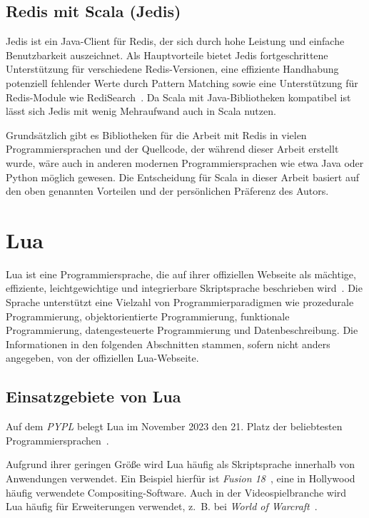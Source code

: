\subsection{Redis mit Scala (Jedis)} %
Jedis ist ein Java-Client für Redis, der sich durch hohe Leistung und einfache Benutzbarkeit auszeichnet. Als Hauptvorteile bietet Jedis fortgeschrittene Unterstützung für verschiedene Redis-Versionen, eine effiziente Handhabung potenziell fehlender Werte durch Pattern Matching sowie eine Unterstützung für Redis-Module wie RediSearch~\cite{redis_inc_jedis_2023}.
Da Scala mit Java-Bibliotheken kompatibel ist lässt sich Jedis mit wenig Mehraufwand auch in Scala nutzen. %

Grundsätzlich gibt es Bibliotheken für die Arbeit mit Redis in vielen Programmiersprachen und der Quellcode, der während dieser Arbeit erstellt wurde, wäre auch in anderen modernen Programmiersprachen wie etwa Java oder Python möglich gewesen.
Die Entscheidung für Scala in dieser Arbeit basiert auf den oben genannten Vorteilen und der persönlichen Präferenz des Autors.


\section{Lua}
Lua ist eine Programmiersprache, die auf ihrer offiziellen Webseite als mächtige, effiziente, leichtgewichtige und integrierbare Skriptsprache beschrieben wird~\cite{ierusalimschy_lua_nodate}. Die Sprache unterstützt eine Vielzahl von Programmierparadigmen wie prozedurale Programmierung, objektorientierte Programmierung, funktionale Programmierung, datengesteuerte Programmierung und Datenbeschreibung. Die Informationen in den folgenden Abschnitten stammen, sofern nicht anders angegeben, von der offiziellen Lua-Webseite.

\subsection{Einsatzgebiete von Lua}
Auf dem \emph{\acf{PYPL}} belegt Lua im November 2023 den 21. Platz der beliebtesten Programmiersprachen~\cite{carbonnelle_pypl_2023}.

Aufgrund ihrer geringen Größe wird Lua häufig als Skriptsprache innerhalb von Anwendungen verwendet. Ein Beispiel hierfür ist \emph{Fusion 18}~\cite{blackmagic_design_fusion_nodate}, eine in Hollywood häufig verwendete Compositing-Software. Auch in der Videospielbranche wird Lua häufig für Erweiterungen verwendet, z.~B. bei \emph{World of Warcraft}~\cite{wowpedia_lua_2023}.

